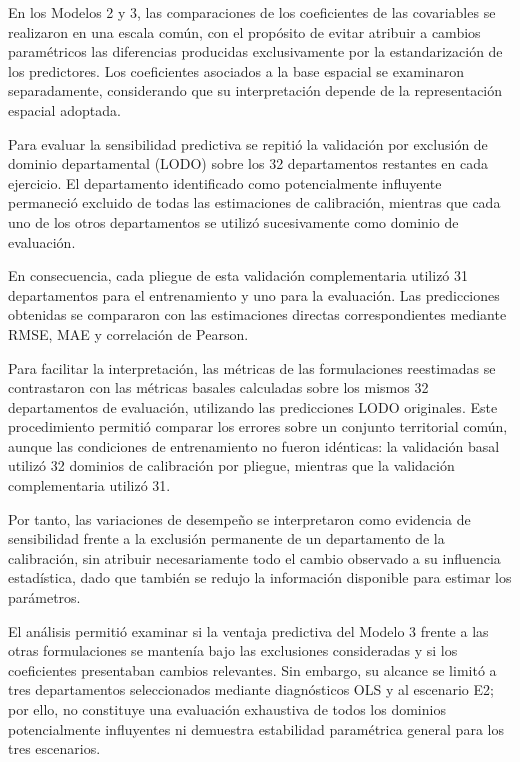 En los Modelos 2 y 3, las comparaciones de los coeficientes de las covariables se realizaron en una escala común, con el propósito de evitar atribuir a cambios paramétricos las diferencias producidas exclusivamente por la estandarización de los predictores. Los coeficientes asociados a la base espacial se examinaron separadamente, considerando que su interpretación depende de la representación espacial adoptada.

Para evaluar la sensibilidad predictiva se repitió la validación por exclusión de dominio departamental (LODO) sobre los 32 departamentos restantes en cada ejercicio. El departamento identificado como potencialmente influyente permaneció excluido de todas las estimaciones de calibración, mientras que cada uno de los otros departamentos se utilizó sucesivamente como dominio de evaluación.

En consecuencia, cada pliegue de esta validación complementaria utilizó 31 departamentos para el entrenamiento y uno para la evaluación. Las predicciones obtenidas se compararon con las estimaciones directas correspondientes mediante RMSE, MAE y correlación de Pearson.

Para facilitar la interpretación, las métricas de las formulaciones reestimadas se contrastaron con las métricas basales calculadas sobre los mismos 32 departamentos de evaluación, utilizando las predicciones LODO originales. Este procedimiento permitió comparar los errores sobre un conjunto territorial común, aunque las condiciones de entrenamiento no fueron idénticas: la validación basal utilizó 32 dominios de calibración por pliegue, mientras que la validación complementaria utilizó 31.

Por tanto, las variaciones de desempeño se interpretaron como evidencia de sensibilidad frente a la exclusión permanente de un departamento de la calibración, sin atribuir necesariamente todo el cambio observado a su influencia estadística, dado que también se redujo la información disponible para estimar los parámetros.

El análisis permitió examinar si la ventaja predictiva del Modelo 3 frente a las otras formulaciones se mantenía bajo las exclusiones consideradas y si los coeficientes presentaban cambios relevantes. Sin embargo, su alcance se limitó a tres departamentos seleccionados mediante diagnósticos OLS y al escenario E2; por ello, no constituye una evaluación exhaustiva de todos los dominios potencialmente influyentes ni demuestra estabilidad paramétrica general para los tres escenarios.

